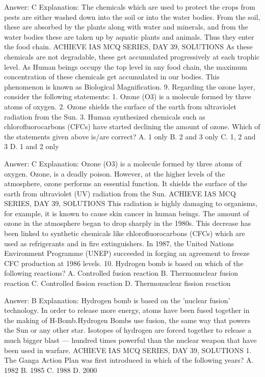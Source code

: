 Answer: C
Explanation: The chemicals which are used to protect the crops from pests are either washed down into the soil or into the water bodies. From the soil, these are absorbed by the plants along with water and minerals, and from the water bodies these are taken up by aquatic plants and animals. Thus they enter the food chain. ACHIEVE IAS MCQ SERIES, DAY 39, SOLUTIONS As these chemicals are not degradable, these get accumulated progressively at each trophic level. As Human beings occupy the top level in any food chain, the maximum concentration of these chemicals get accumulated in our bodies. This phenomenon is known as Biological Magnification. 9. Regarding the ozone layer, consider the following statements: 1. Ozone (O3) is a molecule formed by three atoms of oxygen. 2. Ozone shields the surface of the earth from ultraviolet radiation from the Sun. 3. Human synthesized chemicals such as chlorofluorocarbons (CFCs) have started declining the amount of ozone. Which of the statements given above is/are correct? A. 1 only B. 2 and 3 only C. 1, 2 and 3 D. 1 and 2 only 

Answer: C
Explanation: Ozone (O3) is a molecule formed by three atoms of oxygen. Ozone, is a deadly poison. However, at the higher levels of the atmosphere, ozone performs an essential function. It shields the surface of the earth from ultraviolet (UV) radiation from the Sun. ACHIEVE IAS MCQ SERIES, DAY 39, SOLUTIONS This radiation is highly damaging to organisms, for example, it is known to cause skin cancer in human beings. The amount of ozone in the atmosphere began to drop sharply in the 1980s. This decrease has been linked to synthetic chemicals like chlorofluorocarbons (CFCs) which are used as refrigerants and in fire extinguishers. In 1987, the United Nations Environment Programme (UNEP) succeeded in forging an agreement to freeze CFC production at 1986 levels. 10. Hydrogen bomb is based on which of the following reactions? A. Controlled fusion reaction B. Thermonuclear fusion reaction C. Controlled fission reaction D. Thermonuclear fission reaction 

Answer: B
Explanation: Hydrogen bomb is based on the 'nuclear fusion' technology. In order to release more energy, atoms have been fused together in the making of H-Bomb.Hydrogen Bombs use fusion, the same way that powers the Sun or any other star. Isotopes of hydrogen are forced together to release a much bigger blast — hundred times powerful than the nuclear weapon that have been used in warfare. ACHIEVE IAS MCQ SERIES, DAY 39, SOLUTIONS 1. The Ganga Action Plan was first introduced in which of the following years? A. 1982 B. 1985 C. 1988 D. 2000 

